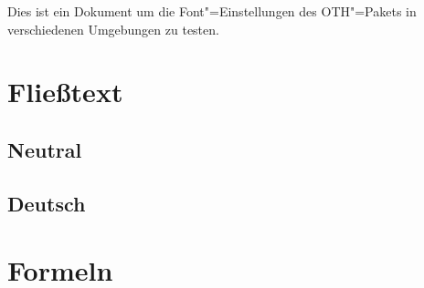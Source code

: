 \documentclass[fontsize=12pt, parskip=half, paper=A4, DIV=12,
DejaVu,
department=FakEI]{OTHRartcl}
\begin{document}
Dies ist ein Dokument um die Font"=Einstellungen des OTH"=Pakets in verschiedenen Umgebungen zu testen.

\section{Fließtext}
\subsection{Neutral}

\lipsum


\subsection{Deutsch}

\Blindtext



\section{Formeln}

\blindmathpaper
\end{document}
